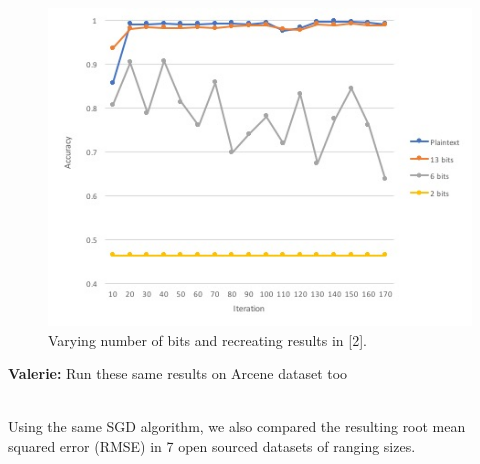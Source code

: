 \documentclass{article}
\theoremstyle{plain}
\theoremstyle{definition}
\theoremstyle{remark}
\newcommand{\vc}[1]{{\textcolor{lred}{\textbf{Valerie:} #1}}}
\begin{document}
\begin{figure}[H]
\centering
  \includegraphics[scale=0.6]{mnist.jpg}
  \caption{Varying number of bits and recreating results in [2].}
  \label{fig:result4}
\end{figure}

\vc{Run these same results on Arcene dataset too}

\noindent
\\Using the same SGD algorithm, we also compared the resulting root mean squared error (RMSE) in 7 open sourced datasets of ranging sizes.
\end{document}
